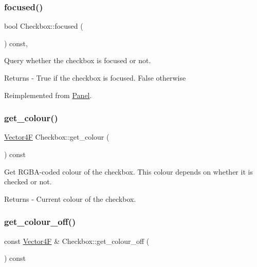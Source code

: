 \subsubsection{\texorpdfstring{focused()}{focused()}}
{\footnotesize\ttfamily bool Checkbox\+::focused (\begin{DoxyParamCaption}{ }\end{DoxyParamCaption}) const\hspace{0.3cm}{\ttfamily [override]}, {\ttfamily [virtual]}}

Query whether the checkbox is focused or not. \begin{DoxyReturn}{Returns}
-\/ True if the checkbox is focused. False otherwise 
\end{DoxyReturn}


Reimplemented from \mbox{\hyperlink{class_panel_ace2217419ea5c2e98a38678c6e2012e1}{Panel}}.

\mbox{\label{class_checkbox_ada05d14b0502bc3534c83478b7bad8fb}} 
\subsubsection{\texorpdfstring{get\+\_\+colour()}{get\_colour()}}
{\footnotesize\ttfamily \mbox{\hyperlink{class_vector4}{Vector4F}} Checkbox\+::get\+\_\+colour (\begin{DoxyParamCaption}{ }\end{DoxyParamCaption}) const}

Get R\+G\+B\+A-\/coded colour of the checkbox. This colour depends on whether it is checked or not. \begin{DoxyReturn}{Returns}
-\/ Current colour of the checkbox. 
\end{DoxyReturn}
\mbox{\label{class_checkbox_ac99d837db8754756bcaa417e96162844}} 
\subsubsection{\texorpdfstring{get\+\_\+colour\+\_\+off()}{get\_colour\_off()}}
{\footnotesize\ttfamily const \mbox{\hyperlink{class_vector4}{Vector4F}} \& Checkbox\+::get\+\_\+colour\+\_\+off (\begin{DoxyParamCaption}{ }\end{DoxyParamCaption}) const}


